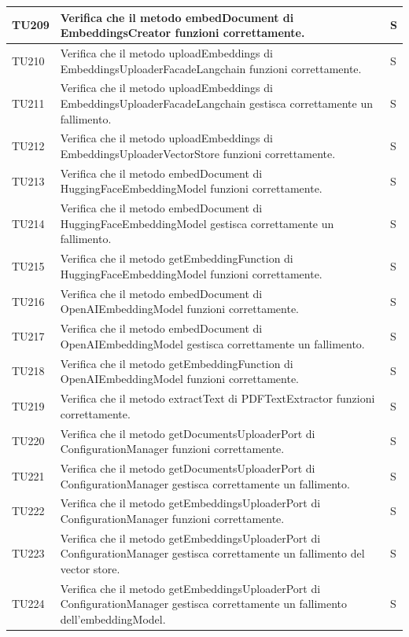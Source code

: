 \documentclass[10pt, a4paper]{article}
\begin{document}
\begin{xltabular}{\textwidth}{p{0.12\textwidth}|p{0.7\textwidth}|X}
\hline
TU209 & Verifica che il metodo embedDocument di EmbeddingsCreator funzioni correttamente. & S \\
\hline
TU210 & Verifica che il metodo uploadEmbeddings di EmbeddingsUploaderFacadeLangchain funzioni correttamente. & S \\
\hline
TU211 & Verifica che il metodo uploadEmbeddings di EmbeddingsUploaderFacadeLangchain gestisca correttamente un fallimento. & S \\
\hline
TU212 & Verifica che il metodo uploadEmbeddings di EmbeddingsUploaderVectorStore funzioni correttamente. & S \\
\hline
TU213 & Verifica che il metodo embedDocument di HuggingFaceEmbeddingModel funzioni correttamente. & S \\
\hline
TU214 & Verifica che il metodo embedDocument di HuggingFaceEmbeddingModel gestisca correttamente un fallimento. & S \\
\hline
TU215 & Verifica che il metodo getEmbeddingFunction di HuggingFaceEmbeddingModel funzioni correttamente. & S \\
\hline
TU216 & Verifica che il metodo embedDocument di OpenAIEmbeddingModel funzioni correttamente. & S \\
\hline
TU217 & Verifica che il metodo embedDocument di OpenAIEmbeddingModel gestisca correttamente un fallimento. & S \\
\hline
TU218 & Verifica che il metodo getEmbeddingFunction di OpenAIEmbeddingModel funzioni correttamente. & S \\
\hline
TU219 & Verifica che il metodo extractText di PDFTextExtractor funzioni correttamente. & S \\
\hline
TU220 & Verifica che il metodo getDocumentsUploaderPort di ConfigurationManager funzioni correttamente. & S \\
\hline
TU221 & Verifica che il metodo getDocumentsUploaderPort di ConfigurationManager gestisca correttamente un fallimento. & S \\
\hline
TU222 & Verifica che il metodo getEmbeddingsUploaderPort di ConfigurationManager funzioni correttamente. & S \\
\hline
TU223 & Verifica che il metodo getEmbeddingsUploaderPort di ConfigurationManager gestisca correttamente un fallimento del vector store. & S \\
\hline
TU224 & Verifica che il metodo getEmbeddingsUploaderPort di ConfigurationManager gestisca correttamente un fallimento dell'embeddingModel. & S \\
\hline

\end{xltabular}
\end{document}
